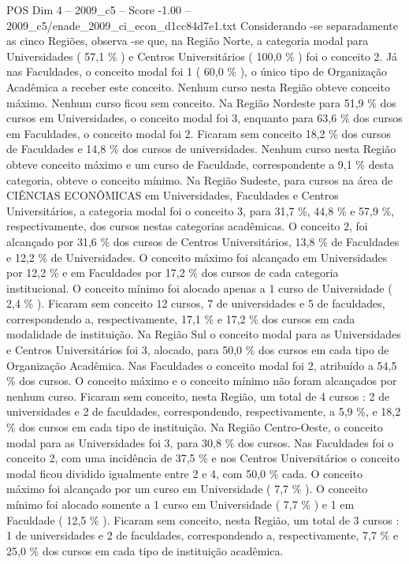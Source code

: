 \begin{textsample}{POS Dim 4 – 2009\_c5 – Score -1.00 – 2009\_c5/enade\_2009\_ci\_econ\_d1cc84d7e1.txt}
Considerando -se separadamente as cinco Regiões, observa -se que, na Região Norte, a categoria modal para Universidades ( 57,1 \% ) e Centros Universitários ( 100,0 \% ) foi o conceito 2.
Já nas Faculdades, o conceito modal foi 1 ( 60,0 \% ), o único tipo de Organização Acadêmica a receber este conceito.
Nenhum curso nesta Região obteve conceito máximo.
Nenhum curso ficou sem conceito.
Na Região Nordeste para 51,9 \% dos cursos em Universidades, o conceito modal foi 3, enquanto para 63,6 \% dos cursos em Faculdades, o conceito modal foi 2.
Ficaram sem conceito 18,2 \% dos cursos de Faculdades e 14,8 \% dos cursos de universidades.
Nenhum curso nesta Região obteve conceito máximo e um curso de Faculdade, correspondente a 9,1 \% desta categoria, obteve o conceito mínimo.
Na Região Sudeste, para cursos na área de CIÊNCIAS ECONÔMICAS em Universidades, Faculdades e Centros Universitários, a categoria modal foi o conceito 3, para 31,7 \%, 44,8 \% e 57,9 \%, respectivamente, dos cursos nestas categorias acadêmicas.
O conceito 2, foi alcançado por 31,6 \% dos cursos de Centros Universitários, 13,8 \% de Faculdades e 12,2 \% de Universidades.
O conceito máximo foi alcançado em Universidades por 12,2 \% e em Faculdades por 17,2 \% dos cursos de cada categoria institucional.
O conceito mínimo foi alocado apenas a 1 curso de Universidade ( 2,4 \% ).
Ficaram sem conceito 12 cursos, 7 de universidades e 5 de faculdades, correspondendo a, respectivamente, 17,1 \% e 17,2 \% dos cursos em cada modalidade de instituição.
Na Região Sul o conceito modal para as Universidades e Centros Universitários foi 3, alocado, para 50,0 \% dos cursos em cada tipo de Organização Acadêmica.
Nas Faculdades o conceito modal foi 2, atribuído a 54,5 \% dos cursos.
O conceito máximo e o conceito mínimo não foram alcançados por nenhum curso.
Ficaram sem conceito, nesta Região, um total de 4 cursos : 2 de universidades e 2 de faculdades, correspondendo, respectivamente, a 5,9 \%, e 18,2 \% dos cursos em cada tipo de instituição.
Na Região Centro-Oeste, o conceito modal para as Universidades foi 3, para 30,8 \% dos cursos.
Nas Faculdades foi o conceito 2, com uma incidência de 37,5 \% e nos Centros Universitários o conceito modal ficou dividido igualmente entre 2 e 4, com 50,0 \% cada.
O conceito máximo foi alcançado por um curso em Universidade ( 7,7 \% ).
O conceito mínimo foi alocado somente a 1 curso em Universidade ( 7,7 \% ) e 1 em Faculdade ( 12,5 \% ).
Ficaram sem conceito, nesta Região, um total de 3 cursos : 1 de universidades e 2 de faculdades, correspondendo a, respectivamente, 7,7 \% e 25,0 \% dos cursos em cada tipo de instituição acadêmica.

\end{textsample}
